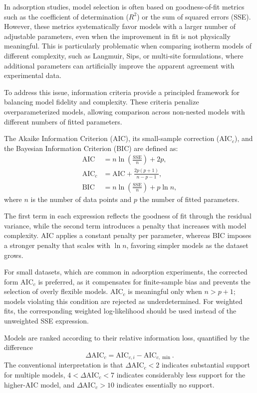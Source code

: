 \documentclass[journal=jacsat,manuscript=article]{achemso}
\begin{document}
In adsorption studies, model selection is often based on goodness-of-fit metrics such as the coefficient of determination ($R^2$) or the sum of squared errors (SSE). However, these metrics systematically favor models with a larger number of adjustable parameters, even when the improvement in fit is not physically meaningful. This is particularly problematic when comparing isotherm models of different complexity, such as Langmuir, Sips, or multi-site formulations, where additional parameters can artificially improve the apparent agreement with experimental data.

To address this issue, information criteria provide a principled framework for balancing model fidelity and complexity. These criteria penalize overparameterized models, allowing comparison across non-nested models with different numbers of fitted parameters.

The Akaike Information Criterion (AIC), its small-sample correction (AIC$_c$), and the Bayesian Information Criterion (BIC) are defined as:
\begin{align}
	\mathrm{AIC}   &= n\ln\!\left(\frac{\mathrm{SSE}}{n}\right) + 2p,
	\label{eq:AIC} \\[4pt]
	\mathrm{AIC}_c &= \mathrm{AIC} + \frac{2p(p+1)}{n-p-1},
	\label{eq:AICc} \\[4pt]
	\mathrm{BIC}   &= n\ln\!\left(\frac{\mathrm{SSE}}{n}\right) + p\ln n,
	\label{eq:BIC}
\end{align}
where $n$ is the number of data points and $p$ the number of fitted parameters.

The first term in each expression reflects the goodness of fit through the residual variance, while the second term introduces a penalty that increases with model complexity. AIC applies a constant penalty per parameter, whereas BIC imposes a stronger penalty that scales with $\ln n$, favoring simpler models as the dataset grows.

For small datasets, which are common in adsorption experiments, the corrected form AIC$_c$ is preferred, as it compensates for finite-sample bias and prevents the selection of overly flexible models. AIC$_c$ is meaningful only when $n>p+1$; models violating this condition are rejected as underdetermined. For weighted fits, the corresponding weighted log-likelihood should be used instead of the unweighted SSE expression.

Models are ranked according to their relative information loss, quantified by the difference
\begin{equation}
	\Delta\mathrm{AIC}_c = \mathrm{AIC}_{c,i} - \mathrm{AIC}_{c,\min}.
\end{equation}
The conventional interpretation is that $\Delta\mathrm{AIC}_c < 2$ indicates substantial support for multiple models, $4 < \Delta\mathrm{AIC}_c < 7$ indicates considerably less support for the higher-AIC model, and $\Delta\mathrm{AIC}_c > 10$ indicates essentially no support.
\end{document}
